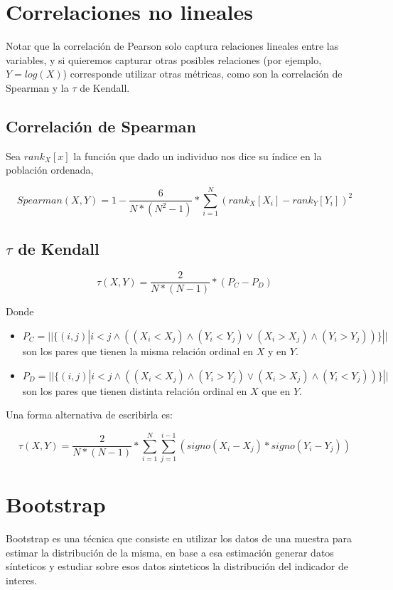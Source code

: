 \section{Correlaciones no lineales}

Notar que la correlación de Pearson solo captura relaciones lineales entre las variables, y si quieremos capturar otras posibles relaciones (por ejemplo, $Y = log(X)$) corresponde utilizar otras métricas, como son la correlación de Spearman y la $\tau$ de Kendall.

\subsection{Correlación de Spearman}

Sea $rank_X[x]$ la función que dado un individuo nos dice su índice en la población ordenada,

$$
    Spearman(X,Y) = 1 - \frac{6}{N*(N^2-1)} * \sum_{i=1}^N (rank_X[X_i]-rank_Y[Y_i])^2
$$

\subsection{$\tau$ de Kendall}

$$
    \tau(X,Y) = \frac{2}{N*(N-1)} * ( P_C - P_D )
$$

Donde 

\begin{itemize}
    \item $P_C = ||\{(i,j)| i<j \wedge ( (X_i < X_j) \wedge (Y_i < Y_j) \vee (X_i > X_j) \wedge (Y_i > Y_j))\}||$ son los pares que tienen la misma relación ordinal en $X$ y en $Y$.
    \item $P_D = ||\{(i,j)| i<j \wedge ( (X_i < X_j) \wedge (Y_i > Y_j) \vee (X_i > X_j) \wedge (Y_i < Y_j))\}||$ son los pares que tienen distinta relación ordinal en $X$ que en $Y$.
\end{itemize}

Una forma alternativa de escribirla es:

$$
    \tau(X,Y) = \frac{2}{N*(N-1)} * \sum_{i=1}^{N} \sum_{j=1}^{i-1} (signo(X_i-X_j) * signo(Y_i-Y_j))
$$

\section{Bootstrap}

Bootstrap es una técnica que consiste en utilizar los datos de una muestra para estimar la distribución de la misma, en base a esa estimación generar datos sínteticos y estudiar sobre esos datos sinteticos la distribución del indicador de interes.

